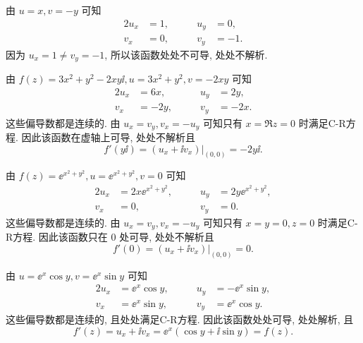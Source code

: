 \begin{solutionenum}[解法一]
  \item 由 $u=x,v=-y$ 可知
  \begin{alignat*}{2}
    u_x&=1,\qquad&u_y&=0,\\
    v_x&=0,\qquad&v_y&=-1.
  \end{alignat*}
  因为 $u_x=1\neq v_y=-1$, 所以该函数处处不可导, 处处不解析.
  \item 由 $f(z)=3x^2+y^2-2xy\ii,u=3x^2+y^2,v=-2xy$ 可知
  \begin{alignat*}{2}
    u_x&=6x,\qquad&u_y&=2y,\\
    v_x&=-2y, \qquad&v_y&=-2x.
  \end{alignat*}
  这些偏导数都是连续的.
  由 $u_x=v_y,v_x=-u_y$ 可知只有 $x=\Re z=0$ 时满足C-R方程.
  因此该函数在虚轴上可导, 处处不解析且
  \[
    f'(y\ii)=(u_x+\ii v_x)\big|_{(0,0)}=-2y\ii.
  \]
  \item 由 $f(z)=\ee^{x^2+y^2},u=\ee^{x^2+y^2},v=0$ 可知
  \begin{alignat*}{2}
    u_x&=2x\ee^{x^2+y^2},\qquad&u_y&=2y\ee^{x^2+y^2},\\
    v_x&=0, \qquad&v_y&=0.
  \end{alignat*}
  这些偏导数都是连续的.
  由 $u_x=v_y,v_x=-u_y$ 可知只有 $x=y=0,z=0$ 时满足C-R方程.
  因此该函数只在 $0$ 处可导, 处处不解析且
  \[
    f'(0)=(u_x+\ii v_x)\big|_{(0,0)}=0.
  \]
  \item 由 $u=\ee^x\cos y,v=\ee^x\sin y$ 可知
  \begin{alignat*}{2}
    u_x&=\ee^x\cos y,\qquad&u_y&=-\ee^x\sin y,\\
    v_x&=\ee^x\sin y,\qquad&v_y&=\ee^x\cos y.
  \end{alignat*}
  这些偏导数都是连续的, 且处处满足C-R方程.
  因此该函数处处可导, 处处解析, 且
  \[
    f'(z)=u_x+\ii v_x=\ee^x(\cos y+\ii\sin y)=f(z).
  \]
\end{solutionenum}

